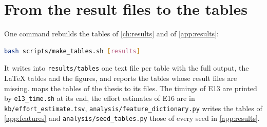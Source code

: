 \section{From the result files to the tables}

One command rebuilds the tables of \cref{ch:results} and of \cref{app:results}:

\begin{lstlisting}[language=bash,numbers=none]
bash scripts/make_tables.sh [results]
\end{lstlisting}

It writes into \texttt{results/tables} one text file per table with the full output, the
\LaTeX{} tables and the figures, and reports the tables whose result files are missing.
 maps the tables of the thesis to its files. The timings of E13 are
printed by \texttt{e13\_time.sh} at its end, the effort estimates of E16 are in
\texttt{kb/effort\_estimate.tsv}, \texttt{analysis/feature\_dictionary.py} writes the tables
of \cref{app:features} and \texttt{analysis/seed\_tables.py} those of every seed in
\cref{app:results}.

